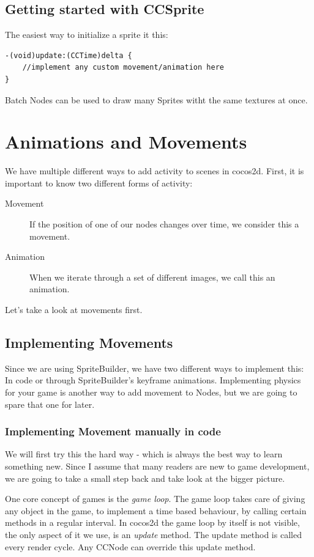 \documentclass{scrreprt}
\newcommand{\cocos}{cocos2d}
\newcommand{\spriteb}{SpriteBuilder}
\begin{document}
\section{Getting started with CCSprite}
The easiest way to initialize a sprite it this:
\begin{lstlisting}
-(void)update:(CCTime)delta {
	//implement any custom movement/animation here
}
\end{lstlisting}
\begin{lamp}[frametitle={Optimizing Performance with Batch Nodes}]
Batch Nodes can be used to draw many Sprites witht the same textures at once.
\end{lamp}
\chapter{Animations and Movements}
We have multiple different ways to add activity to scenes in \cocos{}. First, it
is important to know two different forms of activity:
 
\begin{description}
  \item[Movement] If the position of one of our nodes changes over time, we
  consider this a movement.
  \item[Animation] When we iterate through a set of different images, we call
  this an animation.
\end{description}

Let's take a look at movements first.

\section{Implementing Movements}
Since we are using \spriteb{}, we have two different ways to implement this:
In code or through \spriteb{}'s keyframe animations. Implementing physics for
your game is another way to add movement to Nodes, but we are going to spare
that one for later.

\subsection{Implementing Movement manually in code}
We will first try this the hard way - which is always the best way to learn
something new. Since I assume that many readers are new to game development, we
are going to take a small step back and take look at the bigger picture.

One core concept of games is the \textit{game loop}. The game loop takes care of
giving any object in the game, to implement a time based behaviour, by calling
certain methods in a regular interval. In \cocos{} the game loop by itself is
not visible, the only aspect of it we use, is an \textit{update} method. The
update method is called every render cycle. Any CCNode can override this update
method.
\end{document}
